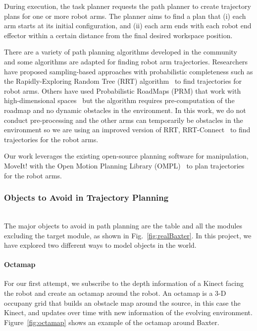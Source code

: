 During execution, the task planner requests the path planner to create trajectory plans for one or more robot arms. The planner aims to find a plan that (i) each arm starts at its initial configuration, and (ii) each arm ends with each robot end effector within a certain distance from the final desired workspace position. 

There are a variety of path planning algorithms developed in the community~\cite{DBLP:books/daglib/0016830} and some algorithms are adapted for finding robot arm trajectories. 
Researchers have proposed sampling-based approaches with probabilistic completeness such as the Rapidly-Exploring Random Tree (RRT) algorithm~\cite{VahrenkampBAKD09} to find trajectories for robot arms. Others have used Probabilistic RoadMaps (PRM) that work with high-dimensional spaces~\cite{KavrakiSLO96} but the algorithm requires pre-computation of the roadmap and no dynamic obstacles in the environment. In this work, we do not conduct pre-processing and the other arms can temporarily be obstacles in the environment so we are using an improved version of RRT, RRT-Connect~\cite{KuffnerL00} to find trajectories for the robot arms.


Our work leverages the existing open-source planning software for manipulation, MoveIt! \cite{moveit} with the Open Motion Planning Library (OMPL)~\cite{sucan2012the-open-motion-planning-library} to plan trajectories for the robot arms. 


\subsubsection{Objects to Avoid in Trajectory Planning}~\\
The major objects to avoid in path planning are the table and all the modules excluding the target module, as shown in Fig.~\ref{fig:realBaxter}. In this project, we have explored two different ways to model objects in the world. 

\paragraph{Octamap}\label{obstacle-octamap}
For our first attempt, we subscribe to the depth information of a Kinect facing the robot and create an octamap around the robot. An octamap is a 3-D occupany grid that builds an obstacle map around the source, in this case the Kinect, and updates over time with new information of the evolving environment. Figure~\ref{fig:octamap} shows an example of the octamap around Baxter.

